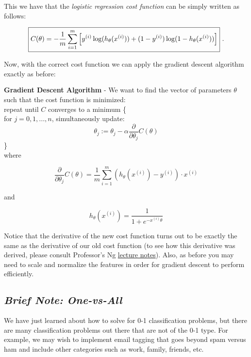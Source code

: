 \documentclass[11pt,a4paper,oneside]{report}
\begin{document}
This we have that the \emph{\color{red} logistic regression cost function} can be simply written as follows:

\[
\boxed{
C(\theta) = -\frac{1}{m}\sum\limits_{i=1}^m \left[y^{(i)}\log(h_{\theta} (x^{(i)})) +(1 - y^{(i)})\log(1 - h_{\theta} (x^{(i)}))\right]} \textnormal{ .}
\]

Now, with the correct cost function we can apply the gradient descent algorithm exactly as before:

\begin{framed}
{\bf Gradient Descent Algorithm} - We want to find the vector of parameters $\theta$ such that the cost function is minimized:\\

\noindent repeat until $C$ converges to a minimum \{\\
\indent for $j = 0,1,...,n$, simultaneously update:
\[
\theta_j := \theta_j - \alpha \frac{\partial}{\partial \theta_j} C(\theta)
\]
\}\\

where

\[
\frac{\partial}{\partial \theta_j}C(\theta) = \frac{1}{m}\sum\limits_{i=1}^m(h_{\theta}(x^{(i)})-y^{(i)})\cdot x^{(i)}
\]

and

\[
h_{\theta}(x^{(i)}) = \frac{1}{1+e^{-x^{(i)}\theta}}
\]

\end{framed}
\newpage

Notice that the derivative of the new cost function turns out to be exactly the same as the derivative of our old cost function (to see how this derivative was derived, please consult Professor's Ng \href{http://cs229.stanford.edu/notes/cs229-notes1.pdf}{lecture notes}). Also, as before you may need to scale and normalize the features in order for gradient descent to perform efficiently.

{\center\color{magenta}
\subsection*{\it\huge Brief Note: One-vs-All}}
We have just learned about how to solve for 0-1 classification problems, but there are many classification problems out there that are not of the 0-1 type. For example, we may wish to implement email tagging that goes beyond spam versus ham and include other categories such as work, family, friends, etc.\\
\end{document}
